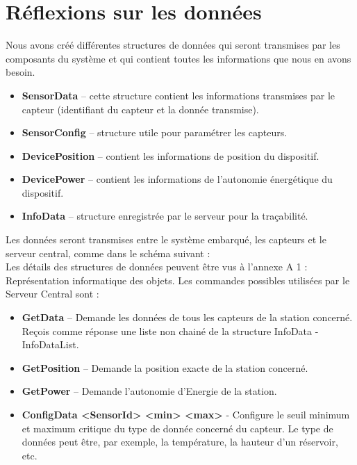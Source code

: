 \section{Réflexions sur les données}

Nous avons créé différentes structures de données qui seront transmises par les composants du système et qui contient toutes les informations que nous en avons besoin. \\

\begin{itemize}
\item \textbf{SensorData} – cette structure contient les informations transmises par le capteur (identifiant du capteur et la donnée transmise).
\item \textbf{SensorConfig} –  structure utile pour paramétrer les capteurs.
\item \textbf{DevicePosition} – contient les informations de position du dispositif.
\item \textbf{DevicePower} – contient les informations de l’autonomie énergétique du dispositif.
\item \textbf{InfoData} – structure enregistrée par le serveur pour la traçabilité.
\end{itemize}

Les données seront transmises entre le système embarqué, les capteurs et le serveur central, comme dans le schéma suivant : \\


Les détails des structures de données peuvent être vus à  l’annexe A 1 : Représentation informatique des objets.
Les commandes possibles utilisées par le Serveur Central sont : \\

\begin{itemize}
\item \textbf{GetData} – Demande les données de tous les capteurs de la station concerné. Reçois comme réponse une liste non chainé de la structure InfoData  - InfoDataList.
\item \textbf{GetPosition} – Demande la position exacte de la station concerné.
\item \textbf{GetPower} – Demande l’autonomie d’Energie de la station.
\item \textbf{ConfigData <SensorId> <min> <max>} - Configure le seuil minimum et maximum critique du type de donnée concerné du capteur. Le type de données peut être, par exemple,  la température, la hauteur d’un réservoir, etc.
\end{itemize}


